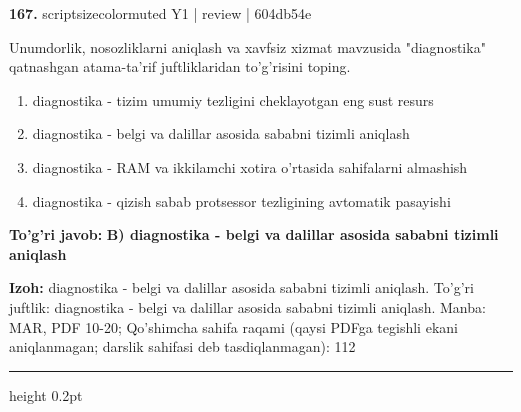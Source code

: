 \documentclass[10pt,a4paper]{article}
\begin{document}
{\bfseries\sffamily\color{ink} 167.} {scriptsizecolor{muted} Y1 | review | 604db54e}
\par
Unumdorlik, nosozliklarni aniqlash va xavfsiz xizmat mavzusida "diagnostika" qatnashgan atama-ta'rif juftliklaridan to'g'risini toping.
\begin{enumerate}[label=\Alph*),leftmargin=9mm]
\item diagnostika - tizim umumiy tezligini cheklayotgan eng sust resurs
\item diagnostika - belgi va dalillar asosida sababni tizimli aniqlash
\item diagnostika - RAM va ikkilamchi xotira o'rtasida sahifalarni almashish
\item diagnostika - qizish sabab protsessor tezligining avtomatik pasayishi
\end{enumerate}
\begin{tcolorbox}[enhanced,breakable,colback=teal!4,colframe=teal!60!black,boxrule=0.45pt,arc=1.2mm,left=2.7mm,right=2.7mm,top=1.8mm,bottom=1.8mm,before skip=2mm,after skip=2mm]
{\bfseries\sffamily\color{teal}To'g'ri javob:} \textbf{B) diagnostika - belgi va dalillar asosida sababni tizimli aniqlash}
\par\smallskip
{\bfseries Izoh:} diagnostika - belgi va dalillar asosida sababni tizimli aniqlash. To'g'ri juftlik: diagnostika - belgi va dalillar asosida sababni tizimli aniqlash. Manba: MAR, PDF 10-20; Qo'shimcha sahifa raqami (qaysi PDFga tegishli ekani aniqlanmagan; darslik sahifasi deb tasdiqlanmagan): 112
\end{tcolorbox}
\vspace{2mm}\hrule height 0.2pt\vspace{3mm}
\end{document}
